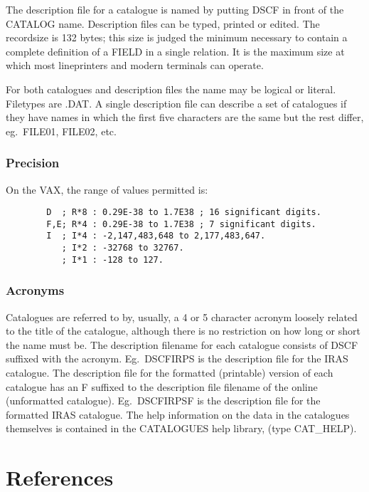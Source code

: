 The description file for a catalogue is named by putting DSCF in front of the
CATALOG name.
Description files can be typed, printed or edited.
The recordsize is 132 bytes; this size is judged the minimum necessary to
contain a complete definition of a FIELD in a single relation.
It is the maximum size at which most lineprinters and modern terminals can
operate.

For both catalogues and description files the name may be logical or literal.
Filetypes are .DAT.
A single description file can describe a set of catalogues if they have names in
which the first five characters are the same but the rest differ, eg.\ FILE01,
FILE02, etc.
\subsubsection {Precision}
On the VAX, the range of values permitted is:
\begin{verbatim}
        D  ; R*8 : 0.29E-38 to 1.7E38 ; 16 significant digits.
        F,E; R*4 : 0.29E-38 to 1.7E38 ; 7 significant digits.
        I  ; I*4 : -2,147,483,648 to 2,177,483,647.
           ; I*2 : -32768 to 32767.
           ; I*1 : -128 to 127.
\end{verbatim}
\subsubsection {Acronyms}
Catalogues are referred to by, usually, a 4 or 5 character acronym 
loosely related to the title of the catalogue, although there is no restriction
on how long or short the name must be. 
The description filename for each catalogue consists of DSCF suffixed with the
acronym.
Eg.\ DSCFIRPS is the description file for the IRAS catalogue.
The description file for the formatted (printable) version of each catalogue
has an F suffixed to the description file filename of the online (unformatted
catalogue).
Eg.\ DSCFIRPSF is the description file for the formatted IRAS catalogue.
The help information on the data in the catalogues themselves is contained in
the CATALOGUES help library, (type CAT\_HELP).
\section {References}

